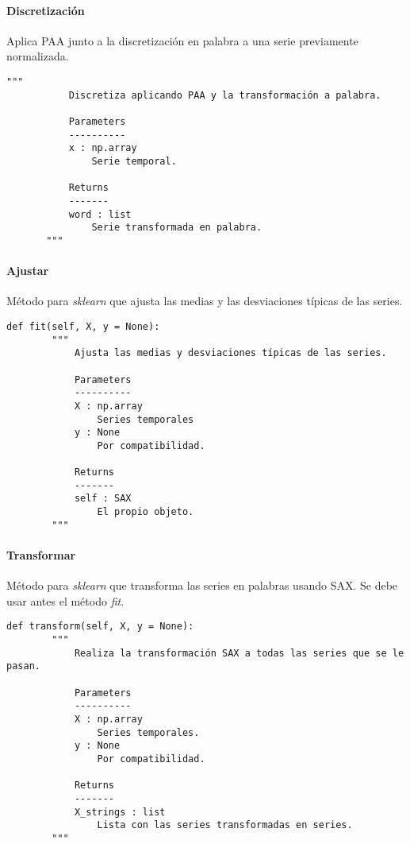 \paragraph{Discretización}

Aplica PAA junto a la discretización en palabra a una serie previamente normalizada.

\begin{lstlisting}
"""
           Discretiza aplicando PAA y la transformación a palabra.

           Parameters
           ----------
           x : np.array
               Serie temporal.

           Returns
           -------
           word : list
               Serie transformada en palabra.
       """
\end{lstlisting}

\paragraph{Ajustar}

Método para \emph{sklearn} que ajusta las medias y las desviaciones típicas de las series.

\begin{lstlisting}
def fit(self, X, y = None):
        """
            Ajusta las medias y desviaciones típicas de las series.

            Parameters
            ----------
            X : np.array
                Series temporales
            y : None
                Por compatibilidad.

            Returns
            -------
            self : SAX
                El propio objeto.
        """
\end{lstlisting}

\paragraph{Transformar}

Método para \emph{sklearn} que transforma las series en palabras usando SAX. Se debe usar antes el método \emph{fit}.

\begin{lstlisting}
def transform(self, X, y = None):
        """
            Realiza la transformación SAX a todas las series que se le pasan.

            Parameters
            ----------
            X : np.array
                Series temporales.
            y : None
                Por compatibilidad.

            Returns
            -------
            X_strings : list
                Lista con las series transformadas en series.
        """
\end{lstlisting}

